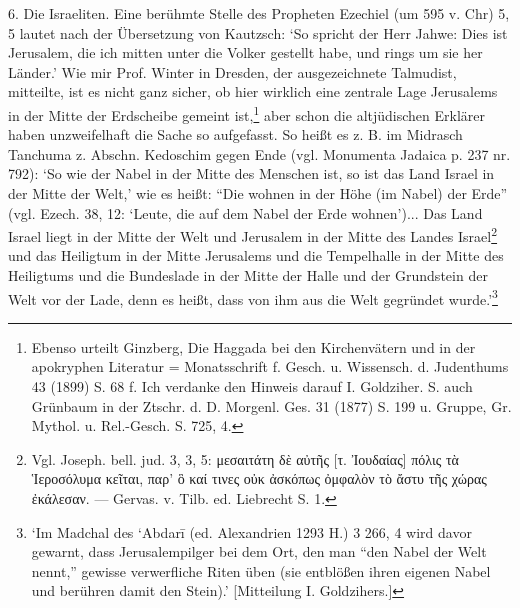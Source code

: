 \documentclass[a4paper, 11pt, oneside]{article}
\begin{document}
6. Die Israeliten. Eine berühmte Stelle des Propheten Ezechiel (um 595 v. Chr) 5, 5 lautet nach der Übersetzung von Kautzsch: `So spricht der Herr Jahwe: Dies ist Jerusalem, die ich mitten unter die Volker gestellt habe, und rings um sie her Länder.' Wie mir Prof. Winter in Dresden, der ausgezeichnete Talmudist, mitteilte, ist es nicht ganz sicher, ob hier wirklich eine zentrale Lage Jerusalems in der Mitte der Erdscheibe gemeint ist,\footnote{Ebenso urteilt Ginzberg, Die Haggada bei den Kirchenvätern und in der apokryphen Literatur = Monatsschrift f. Gesch. u. Wissensch. d. Judenthums 43 (1899) S. 68 f. Ich verdanke den Hinweis darauf I. Goldziher. S. auch Grünbaum in der Ztschr. d. D. Morgenl. Ges. 31 (1877) S. 199 u. Gruppe, Gr. Mythol. u. Rel.-Gesch. S. 725, 4.} aber schon die altjüdischen Erklärer haben unzweifelhaft die Sache so aufgefasst. So heißt es z. B. im Midrasch Tanchuma z. Abschn. Kedoschim gegen Ende (vgl. Monumenta Jadaica p. 237 nr. 792): `So wie der Nabel in der Mitte des Menschen ist, so ist das Land Israel in der Mitte der Welt,' wie es heißt: "`Die wohnen in der Höhe (im Nabel) der Erde"' (vgl. Ezech. 38, 12: `Leute, die auf dem Nabel der Erde wohnen')... Das Land Israel liegt in der Mitte der Welt und Jerusalem in der Mitte des Landes Israel\footnote{Vgl. Joseph. bell. jud. 3, 3, 5: μεσαιτάτη δὲ αὐτῆς [τ. Ἰουδαίας] πόλις τὰ Ἱεροσόλυμα κεῖται, παρ' ὃ καί τινες οὐκ ἀσκόπως ὀμφαλὸν τὸ ἄστυ τῆς χώρας ἐκάλεσαν. --- Gervas. v. Tilb. ed. Liebrecht S. 1.} und das Heiligtum in der Mitte Jerusalems und die Tempelhalle in der Mitte des Heiligtums und die Bundeslade in der Mitte der Halle und der Grundstein der Welt vor der Lade, denn es heißt, dass von ihm aus die Welt gegründet wurde.'\footnote{`Im Madchal des `Abdarī (ed. Alexandrien 1293 H.) 3 266, 4 wird davor gewarnt, dass Jerusalempilger bei dem Ort, den man "`den Nabel der Welt nennt,"' gewisse verwerfliche Riten üben (sie entblößen ihren eigenen Nabel und berühren damit den Stein).' [Mitteilung I. Goldzihers.]}
\end{document}
